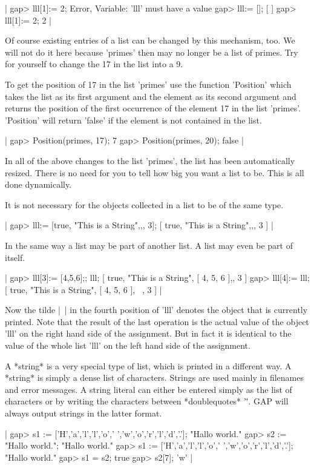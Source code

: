 |    gap> lll[1]:= 2;
    Error, Variable: 'lll' must have a value
    gap> lll:= [];
    [  ]
    gap> lll[1]:= 2;
    2 |

Of course  existing  entries of a  list can be changed by this mechanism,
too.  We will not do it here  because  'primes' then may no  longer  be a
list of primes.  Try for yourself to change the 17 in the list into a 9.

To  get  the  position  of  17  in  the  list  'primes' use  the function
'Position'  which takes the list as its first argument and the element as
its second  argument and returns the position of  the first occurrence of
the element 17 in  the list 'primes'.  'Position' will return 'false'  if
the element is not contained in the list.

|    gap> Position(primes, 17);
    7
    gap> Position(primes, 20);
    false |

In  all  of the  above changes to  the  list 'primes',  the list has been
automatically resized.  There  is no need  for you to tell {\GAP} how big
you want a list to be.  This is all done dynamically.

It is not necessary for the objects collected in a list to be of the same
type.

|    gap> lll:= [true, "This is a String",,, 3];
    [ true, "This is a String",,, 3 ] |

In the same way a list may be part of another  list.  A list  may even be
part of itself.

|    gap> lll[3]:= [4,5,6];; lll;
    [ true, "This is a String", [ 4, 5, 6 ],, 3 ]
    gap> lll[4]:= lll;
    [ true, "This is a String", [ 4, 5, 6 ], ~, 3 ] |

Now the tilde |~| in the fourth position of 'lll' denotes the object that
is currently printed.  Note that the  result of the last operation is the
actual  value of  the  object  'lll'  on  the  right  hand  side  of  the
assignment.  But in fact  it is identical to the value  of the whole list
'lll' on the left hand side of the assignment.

A  *string*  is  a  very  special  type of list,  which  is printed  in a
different way. A *string* is simply a dense list  of characters.  Strings
are used mainly in  filenames and error  messages.   A string literal can
either be  entered  simply as the list  of characters or  by writing  the
characters between *doublequotes* '\"'.  GAP  will  always output strings
in the latter format.

|    gap> s1 := ['H','a','l','l','o',' ','w','o','r','l','d','.'];
    "Hallo world."
    gap> s2 := "Hallo world.";
    "Hallo world."
    gap> s1 := ['H','a','l','l','o',' ','w','o','r','l','d','.'];
    "Hallo world."
    gap> s1 = s2;
    true
    gap> s2[7];
    'w' |

